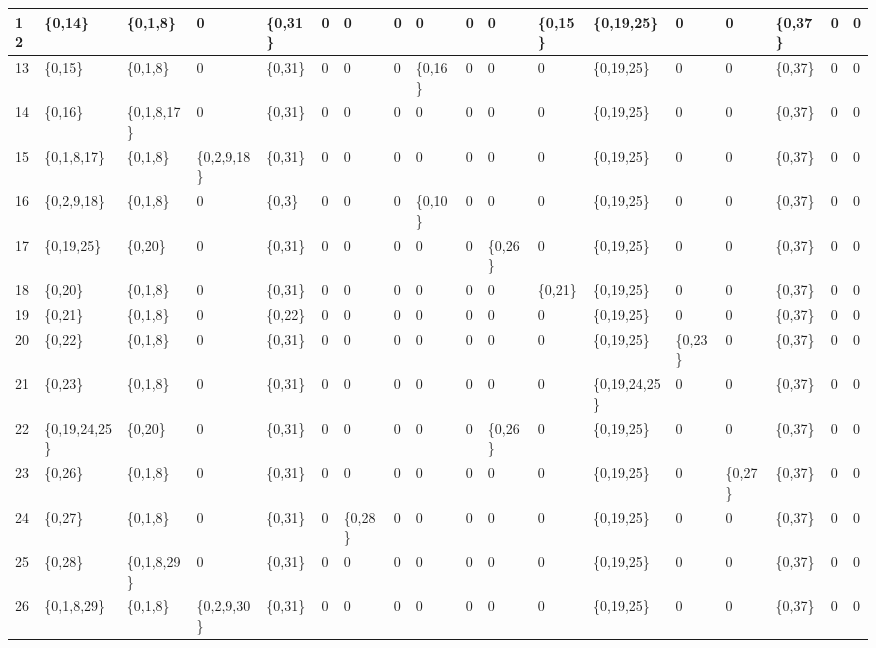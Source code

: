 \documentclass{article}
\begin{document}
\begin{table}[!htbp]
\begin{adjustbox}{max width=\textwidth}
\begin{tabular}{|l|l|l|l|l|l|l|l|l|l|l|l|l|l|l|l|l|l|}
                12 & \{0,14\} & \{0,1,8\} & 0 & \{0,31\} & 0 & 0 & 0 & 0 & 0 & 0 & \{0,15\} & \{0,19,25\} & 0 & 0 & \{0,37\} & 0 & 0 \\ \hline
                13 & \{0,15\} & \{0,1,8\} & 0 & \{0,31\} & 0 & 0 & 0 & \{0,16\} & 0 & 0 & 0 & \{0,19,25\} & 0 & 0 & \{0,37\} & 0 & 0 \\ \hline
                14 & \{0,16\} & \{0,1,8,17\} & 0 & \{0,31\} & 0 & 0 & 0 & 0 & 0 & 0 & 0 & \{0,19,25\} & 0 & 0 & \{0,37\} & 0 & 0 \\ \hline
                15 & \{0,1,8,17\} & \{0,1,8\} & \{0,2,9,18\} & \{0,31\} & 0 & 0 & 0 & 0 & 0 & 0 & 0 & \{0,19,25\} & 0 & 0 & \{0,37\} & 0 & 0 \\ \hline
                16 & \{0,2,9,18\} & \{0,1,8\} & 0 & \{0,3\} & 0 & 0 & 0 & \{0,10\} & 0 & 0 & 0 & \{0,19,25\} & 0 & 0 & \{0,37\} & 0 & 0 \\ \hline
                17 & \{0,19,25\} & \{0,20\} & 0 & \{0,31\} & 0 & 0 & 0 & 0 & 0 & \{0,26\} & 0 & \{0,19,25\} & 0 & 0 & \{0,37\} & 0 & 0 \\ \hline
                18 & \{0,20\} & \{0,1,8\} & 0 & \{0,31\} & 0 & 0 & 0 & 0 & 0 & 0 & \{0,21\} & \{0,19,25\} & 0 & 0 & \{0,37\} & 0 & 0 \\ \hline
                19 & \{0,21\} & \{0,1,8\} & 0 & \{0,22\} & 0 & 0 & 0 & 0 & 0 & 0 & 0 & \{0,19,25\} & 0 & 0 & \{0,37\} & 0 & 0 \\ \hline
                20 & \{0,22\} & \{0,1,8\} & 0 & \{0,31\} & 0 & 0 & 0 & 0 & 0 & 0 & 0 & \{0,19,25\} & \{0,23\} & 0 & \{0,37\} & 0 & 0 \\ \hline
                21 & \{0,23\} & \{0,1,8\} & 0 & \{0,31\} & 0 & 0 & 0 & 0 & 0 & 0 & 0 & \{0,19,24,25\} & 0 & 0 & \{0,37\} & 0 & 0 \\ \hline
                22 & \{0,19,24,25\} & \{0,20\} & 0 & \{0,31\} & 0 & 0 & 0 & 0 & 0 & \{0,26\} & 0 & \{0,19,25\} & 0 & 0 & \{0,37\} & 0 & 0 \\ \hline
                23 & \{0,26\} & \{0,1,8\} & 0 & \{0,31\} & 0 & 0 & 0 & 0 & 0 & 0 & 0 & \{0,19,25\} & 0 & \{0,27\} & \{0,37\} & 0 & 0 \\ \hline
                24 & \{0,27\} & \{0,1,8\} & 0 & \{0,31\} & 0 & \{0,28\} & 0 & 0 & 0 & 0 & 0 & \{0,19,25\} & 0 & 0 & \{0,37\} & 0 & 0 \\ \hline
                25 & \{0,28\} & \{0,1,8,29\} & 0 & \{0,31\} & 0 & 0 & 0 & 0 & 0 & 0 & 0 & \{0,19,25\} & 0 & 0 & \{0,37\} & 0 & 0 \\ \hline
                26 & \{0,1,8,29\} & \{0,1,8\} & \{0,2,9,30\} & \{0,31\} & 0 & 0 & 0 & 0 & 0 & 0 & 0 & \{0,19,25\} & 0 & 0 & \{0,37\} & 0 & 0 \\ \hline

\end{tabular}
\end{adjustbox}
\end{table}
\end{document}
